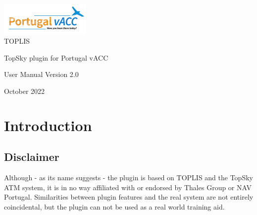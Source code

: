 \documentclass[11pt,a4paper,oldfontcommands]{memoir}
\begin{document}
%
%
\thispagestyle{empty}

{%
\sffamily

\centering
\Large

~\vspace{\fill}

{\huge 
\includegraphics{img/logo.png}\\
TOPLIS
}

\vspace{2.5cm}

{\LARGE
TopSky plugin for Portugal vACC
}

\vspace{3.5cm}

User Manual
\medskip
Version 2.0
\medskip

\vspace{\fill}

October 2022

}%

\cleardoublepage

\tableofcontents*

\clearpage


\chapter{Introduction}

\section{Disclaimer}
Although - as its name suggests - the plugin is based on TOPLIS and the TopSky ATM system, it is in no way affiliated with or endorsed by Thales Group or NAV Portugal. Similarities between plugin features and the real system are not entirely coincidental, but the plugin can not be used as a real world training aid. ~\cite{git}
\end{document}
